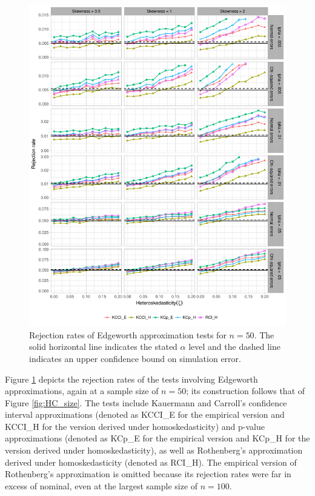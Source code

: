\documentclass[12pt]{article}\usepackage[]{graphicx}\usepackage[]{color}
\newenvironment{knitrout}{}{} %
\begin{document}
\begin{knitrout}
\color{fgcolor}\begin{figure}[p]

{\centering \includegraphics[width=\linewidth]{HC_fig/Edgeworth_size-1} 

}

\caption[Rejection rates of Edgeworth approximation tests for $n = 50$]{Rejection rates of Edgeworth approximation tests for $n = 50$. The solid horizontal line indicates the stated $\alpha$ level and the dashed line indicates an upper confidence bound on simulation error.}\label{fig:Edgeworth_size}
\end{figure}


\end{knitrout}

Figure \ref{fig:Edgeworth_size} depicts the rejection rates of the tests involving Edgeworth approximations, again at a sample size of $n = 50$; its construction follows that of Figure \ref{fig:HC_size}. The tests include Kauermann and Carroll's \citeyearpar{Kauermann2001note} confidence interval approximations (denoted as KCCI\_E for the empirical version and KCCI\_H for the version derived under homoskedasticity) and p-value approximations (denoted as KCp\_E for the empirical version and KCp\_H for the version derived under homoskedasticity), as well as Rothenberg's \citeyearpar{Rothenberg1988approximate} approximation derived under homoskedasticity (denoted as RCI\_H). The empirical version of Rothenberg's approximation is omitted because its rejection rates were far in excess of nominal, even at the largest sample size of $n = 100$. 
\end{document}
